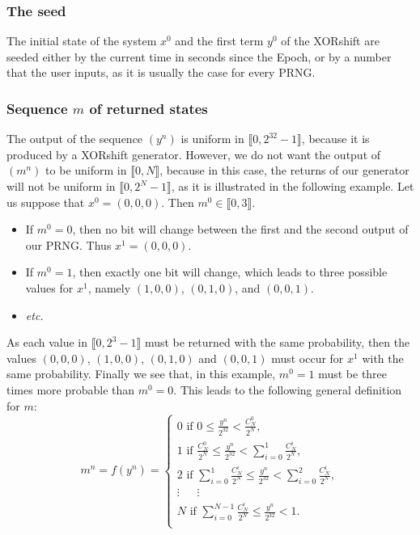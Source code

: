 \documentclass[10pt, a4paper, conference, compsocconf]{IEEEtran}
\begin{document}
\subsubsection{The seed}
\label{algo seed}
The initial state of the system $x^0$ and the first term $y^0$ of the XORshift are seeded either by 
the current time in seconds since the Epoch, or by a number that the user inputs, as it is usually the case for every PRNG.


\subsubsection{Sequence $m$ of returned states}
\label{algo m}
The output of the sequence $(y^n)$ is uniform in $\llbracket 0, 2^{32}-1 \rrbracket$, because it is produced by a XORshift generator. However, we do not want the output of $(m^n)$ to be uniform in $\llbracket 0, N \rrbracket$, because in this case, the returns of our generator will not be uniform in $\llbracket 0, 2^{N}-1 \rrbracket$, as it is illustrated in the following example. Let us suppose that $x^0=(0,0,0)$. Then $m^0 \in \llbracket 0, 3 \rrbracket$.
\begin{itemize}
\item If $m^0=0$, then no bit will change between the first and the second output of our PRNG. Thus $x^1 = (0,0,0)$.
\item If $m^0=1$, then exactly one bit will change, which leads to three possible values for $x^1$, namely $(1,0,0)$, $(0,1,0)$, and $(0,0,1)$.
\item \emph{etc.}
\end{itemize}
As each value in $\llbracket 0, 2^3-1 \rrbracket$ must be returned with the same probability, then the values $(0,0,0)$, $(1,0,0)$, $(0,1,0)$ and $(0,0,1)$ must occur for $x^1$ with the same probability. Finally we see that, in this example, $m^0=1$ must be three times more probable than $m^0=0$.
This leads to the following general definition for $m$:
\begin{equation}
\label{Formula}
m^n = f(y^n)=
\left\{
\begin{array}{l}
0 \text{ if }0				\leqslant\frac{y^n}{2^{32}}<\frac{C^0_N}{2^N},\\
1 \text{ if }\frac{C^0_N}{2^N}		\leqslant\frac{y^n}{2^{32}}<\sum_{i=0}^1\frac{C^i_N}{2^N},\\
2 \text{ if }\sum_{i=0}^1\frac{C^i_N}{2^N}	\leqslant\frac{y^n}{2^{32}}<\sum_{i=0}^2\frac{C^i_N}{2^N},\\
\vdots~~~~~					~~\vdots~~~		    ~~~~\\
N \text{ if }\sum_{i=0}^{N-1}\frac{C^i_N}{2^N}	\leqslant\frac{y^n}{2^{32}}<1.\\
\end{array}
\right.
\end{equation}
\end{document}
